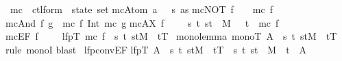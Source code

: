\begin{isabellebody}
\ mc\ {\isacharcolon}{\isacharcolon}\ {\isachardoublequote}ctl{\isacharunderscore}form\ {\isasymRightarrow}\ state\ set{\isachardoublequote}\isanewline
{}\isanewline
{\isachardoublequote}mc{\isacharparenleft}Atom\ a{\isacharparenright}\ \ {\isacharequal}\ {\isacharbraceleft}s{\isachardot}\ a{\isasymin}s{\isacharbraceright}{\isachardoublequote}\isanewline
{\isachardoublequote}mc{\isacharparenleft}NOT\ f{\isacharparenright}\ \ \ {\isacharequal}\ {\isacharminus}mc\ f{\isachardoublequote}\isanewline
{\isachardoublequote}mc{\isacharparenleft}And\ f\ g{\isacharparenright}\ {\isacharequal}\ mc\ f\ Int\ mc\ g{\isachardoublequote}\isanewline
{\isachardoublequote}mc{\isacharparenleft}AX\ f{\isacharparenright}\ \ \ \ {\isacharequal}\ {\isacharbraceleft}s{\isachardot}\ {\isasymforall}t{\isachardot}\ {\isacharparenleft}s{\isacharcomma}t{\isacharparenright}\ {\isasymin}\ M\ \ {\isasymlongrightarrow}\ t\ {\isasymin}\ mc\ f{\isacharbraceright}{\isachardoublequote}\isanewline
{\isachardoublequote}mc{\isacharparenleft}EF\ f{\isacharparenright}\ \ \ \ {\isacharequal}\ lfp{\isacharparenleft}{\isasymlambda}T{\isachardot}\ mc\ f\ {\isasymunion}\ {\isacharbraceleft}s{\isachardot}\ {\isasymexists}t{\isachardot}\ {\isacharparenleft}s{\isacharcomma}t{\isacharparenright}{\isasymin}M\ {\isasymand}\ t{\isasymin}T{\isacharbraceright}{\isacharparenright}{\isachardoublequote}\isanewline
\isanewline
{}\ mono{\isacharunderscore}lemma{\isacharcolon}\ {\isachardoublequote}mono{\isacharparenleft}{\isasymlambda}T{\isachardot}\ A\ {\isasymunion}\ {\isacharbraceleft}s{\isachardot}\ {\isasymexists}t{\isachardot}\ {\isacharparenleft}s{\isacharcomma}t{\isacharparenright}{\isasymin}M\ {\isasymand}\ t{\isasymin}T{\isacharbraceright}{\isacharparenright}{\isachardoublequote}\isanewline
{}rule\ monoI{\isacharparenright}\isanewline
{}blast{\isacharparenright}\isanewline
\isanewline
{}\ lfp{\isacharunderscore}conv{\isacharunderscore}EF{\isacharcolon}\isanewline
{\isachardoublequote}lfp{\isacharparenleft}{\isasymlambda}T{\isachardot}\ A\ {\isasymunion}\ {\isacharbraceleft}s{\isachardot}\ {\isasymexists}t{\isachardot}\ {\isacharparenleft}s{\isacharcomma}t{\isacharparenright}{\isasymin}M\ {\isasymand}\ t{\isasymin}T{\isacharbraceright}{\isacharparenright}\ {\isacharequal}\ {\isacharbraceleft}s{\isachardot}\ {\isasymexists}t{\isachardot}\ {\isacharparenleft}s{\isacharcomma}t{\isacharparenright}\ {\isasymin}\ M{\isacharcircum}{\isacharasterisk}\ {\isasymand}\ t\ {\isasymin}\ A{\isacharbraceright}{\isachardoublequote}\isanewline

\end{isabellebody}
